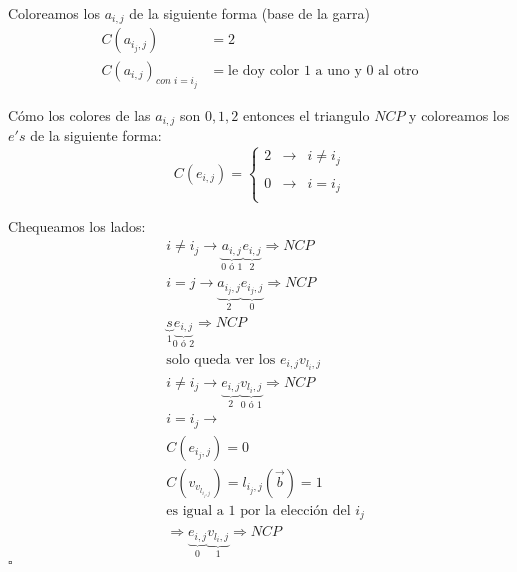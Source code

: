 \documentclass[12pt,a4paper]{article}
\begin{document}
Coloreamos los $a_{i,j}$ de la siguiente forma (base de la garra)
\begin{align*}
    C(a_{i_{j},j}) &= 2 \\
    C(a_{i,j})_{con\,\, i = i_{j}} &= \text{le doy color $1$ a uno y $0$ al otro}
\end{align*}

Cómo los colores de las $a_{i,j}$ son $0,1,2$ entonces el triangulo $NCP$ y coloreamos 
los $e's$ de la siguiente forma:
$$C(e_{i,j})= \left\{ \begin{array}{lcc}
    2 & \to & i \neq i_{j} \\
    \\ 0& \to & i = i_{j}\\
    \end{array}
    \right.$$

Chequeamos los lados:
\begin{align*}
    &i \neq i_{j} \to \underbrace{a_{i,j}}_{0\,\,\text{ó}\,\,1}\underbrace{e_{i,j}}_{2} \Rightarrow NCP \\
    &i = j \to \underbrace{a_{i_{j},j}}_{2}\underbrace{e_{i_{j},j}}_{0} \Rightarrow NCP \\
    &\underbrace{s}_{1}\underbrace{e_{i,j}}_{0\,\,\text{ó}\,\,2} \Rightarrow NCP \\
    &\text{solo queda ver los}\,\, e_{i,j}v_{l_{i},j}\\
    &i \neq i_{j} \to \underbrace{e_{i,j}}_{2}\underbrace{v_{l_{i},j}}_{0\,\,\text{ó}\,\,1} \Rightarrow NCP \\
    &i = i_{j} \to \\
    &C(e_{i_{j},j}) = 0\\
    &C(v_{v_{l_{i_{j},j}}}) = l_{i_{j},j}(\overrightarrow{b}) = 1\\
    &\text{es igual a $1$ por la elección del $i_{j}$}\\
    &\Rightarrow \underbrace{e_{i,j}}_{0}\underbrace{v_{l_{i},j}}_{1} \Rightarrow NCP
\end{align*}
$\square$
\end{document}
